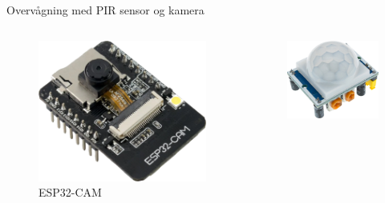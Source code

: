 \documentclass[aspectratio=169]{beamer}
\begin{document}
\begin{frame}{Overvågning med PIR sensor og kamera}
\begin{columns}
\begin{column}{0.4\textwidth}
\begin{columns}
			\begin{column}{0.45\textwidth}
				\begin{figure}[height=0.2\textheight]
  					\includegraphics[height=0.2\textheight,keepaspectratio=true]{assets/pictures/esp32cam.png}
  					\caption{ESP32-CAM}
  					\label{fig:}
				\end{figure}
			\end{column}
			\begin{column}{0.45\textwidth}
				\begin{figure}[height=0.2\textheight]
  					\includegraphics[height=0.2\textheight,keepaspectratio=true]{assets/pictures/hc-sr501.png}

\end{figure}
\end{column}
\end{columns}
\end{column}
\end{columns}
\end{frame}
\end{document}
